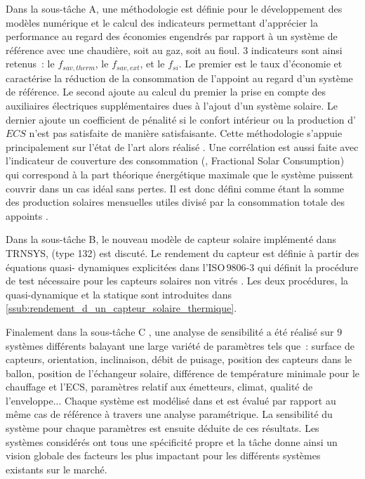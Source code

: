 Dans la sous-tâche A, une méthodologie est définie pour le développement des modèles
numérique et le calcul des indicateurs permettant d’apprécier la performance au regard des
économies engendrés par rapport à un système de référence avec une chaudière, soit au gaz,
soit au fioul. $3$ indicateurs sont ainsi retenus~: le $f_{sav, therm}$, le $f_{sav,
ext}$, et le $f_{si}$. Le premier est le taux d’économie et caractérise la réduction de la
consommation de l’appoint au regard d’un système de référence. Le second ajoute au calcul
du premier la prise en compte des auxiliaires électriques supplémentaires dues à l’ajout
d’un système solaire. Le dernier ajoute un coefficient de pénalité si le confort
intérieur ou la production d’$ECS$ n’est pas satisfaite de manière satisfaisante.
Cette méthodologie s’appuie principalement sur l’état de l’art alors réalisé \parencite{Task26A2002}.
Une corrélation est aussi faite avec l’indicateur de couverture des consommation
(, Fractional Solar Consumption) qui correspond à la part
théorique énergétique maximale que le système puissent couvrir dans un cas idéal sans
pertes. Il est donc défini comme étant la somme des production solaires mensuelles
utiles divisé par la consommation totale des appoints \parencite{Letz2009}.

Dans la sous-tâche B, le nouveau modèle de capteur solaire implémenté dans TRNSYS, (type
132) est discuté. Le rendement du capteur est définie à partir des équations quasi-
dynamiques explicitées dans l’ISO\,$9806$-$3$ qui définit la procédure de test nécessaire
pour les capteurs solaires non vitrés \parencite{Task26B2002}. Les deux procédures, la
quasi-dynamique et la statique sont introduites dans \ref{ssub:rendement_d_un_capteur_solaire_thermique}.

Finalement dans la sous-tâche C \parencite{Task26C2007}, une analyse de sensibilité a été réalisé sur $9$ systèmes
différents balayant une large variété de paramètres tels que~: surface de capteurs,
orientation, inclinaison, débit de puisage, position des capteurs dans le ballon, position
de l’échangeur solaire, différence de température minimale pour le chauffage et l’ECS,
paramètres relatif aux émetteurs, climat, qualité de l’enveloppe... Chaque système est
modélisé dans  et est évalué par rapport au même cas de référence à
travers une analyse paramétrique. La sensibilité du système pour chaque paramètres est ensuite déduite de ces résultats.
Les systèmes considérés ont tous une spécificité propre et la tâche donne ainsi
un vision globale des facteurs les plus impactant pour les différents systèmes existants
sur le marché.


